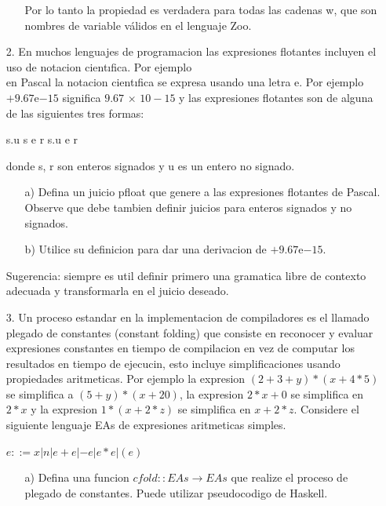 \documentclass{article}
\begin{document}
\begin{itemize}
\begin{itemize}
                Por lo tanto la propiedad es verdadera para todas las cadenas w, que son nombres de variable válidos en el lenguaje Zoo.
            \end{itemize} 
        \item[2.] En muchos lenguajes de programacion las expresiones flotantes incluyen el uso de notacion cientıfica. Por ejemplo\\
        en Pascal la notacion cientıfica se expresa usando una letra e. Por ejemplo $+9.67$e$-15$ significa $9.67$ × $10-15$ y las expresiones flotantes son de alguna de las siguientes tres formas:
            \begin{center}
                s.u s e r s.u e r
            \end{center}
        donde s, r son enteros signados y u es un entero no signado.
            \begin{itemize}
                \item[a)] Defina un juicio pfloat que genere a las expresiones flotantes de Pascal. Observe que debe tambien definir juicios para enteros signados y no signados.
                \item[b)] Utilice su definicion para dar una derivacion de $+9.67$e$-15$.
            \end{itemize}
        Sugerencia: siempre es util definir primero una gramatica libre de contexto adecuada y transformarla en el juicio deseado.

        \item[3.] Un proceso estandar en la implementacion de compiladores es el llamado plegado de constantes (constant folding) que consiste en reconocer y evaluar expresiones constantes en tiempo de compilacion en vez de computar los resultados en tiempo de ejecucin, esto incluye simplificaciones usando propiedades aritmeticas. Por ejemplo la expresion $(2+3+y)*(x+4*5)$ se simplifica a $(5 + y)*(x + 20)$, la expresion $2 * x + 0$ se simplifica en $2 * x$ y la expresion $1 * (x + 2 * z)$ se simplifica en $x + 2 * z$. Considere el siguiente lenguaje EAs de expresiones aritmeticas simples.
            \begin{center}
                $e ::= x | n | e + e | -e | e * e | (e)$
            \end{center}
    
            \begin{itemize}
                \item[a)] Defina una funcion $cfold :: EAs \rightarrow EAs$ que realize el proceso de plegado de constantes. Puede utilizar pseudocodigo de Haskell.


\end{itemize}
\end{itemize}
\end{document}
